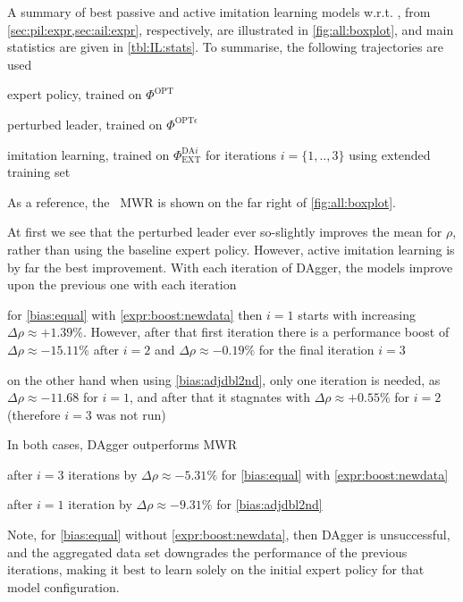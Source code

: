 \documentclass[smallextended]{svjour3}
\begin{document}
	A summary of  best passive and active imitation learning models
	w.r.t. \namerho, from 
	\cref{sec:pil:expr,sec:ail:expr}, respectively, are illustrated in 
	\cref{fig:all:boxplot}, and main statistics are given in 
	\cref{tbl:IL:stats}. To summarise, the following trajectories are used
	\begin{enumerate*}
		\item expert policy, trained on $\Phi^{\text{OPT}}$
		\item perturbed leader, trained on $\Phi^{\text{OPT}\epsilon}$
		\item imitation learning, trained on $\Phi^{\text{DA}i}_{\text{EXT}}$ for 
		iterations $i=\{1,..,3\}$ using extended training set
	\end{enumerate*}
	As a reference, the \sdr\ MWR is shown on the far right of 
	\cref{fig:all:boxplot}.
	
	At first we see that the perturbed leader ever so-slightly improves the mean 
	for $\rho$, rather than using the baseline expert policy. 
	However, active imitation learning is by far the best improvement. With each 
	iteration of DAgger, the models improve upon the previous one with each 
	iteration
	\begin{enumerate*}  
		\item for \ref{bias:equal} with \ref{expr:boost:newdata} then $i=1$ starts 
		with increasing  $\Delta\rho\approx+1.39\%$. However, after that first 
		iteration there is a performance boost of $\Delta\rho\approx-15.11\%$ after 
		$i=2$ and $\Delta\rho\approx-0.19\%$ for the final iteration $i=3$
		\item on the other hand when using \ref{bias:adjdbl2nd}, only one iteration 
		is needed, as  $\Delta\rho\approx-11.68$ for $i=1$, and after that it 
		stagnates with $\Delta\rho\approx+0.55\%$ for $i=2$ 
		(therefore $i=3$ was not run)
	\end{enumerate*}
	In both cases, DAgger outperforms MWR
	\begin{enumerate*}
		\item after $i=3$ iterations by $\Delta\rho\approx-5.31\%$ for 
		\ref{bias:equal} with \ref{expr:boost:newdata}
		\item after $i=1$ iteration by $\Delta\rho\approx-9.31\%$ for 
		\ref{bias:adjdbl2nd}
	\end{enumerate*}
	Note, for \ref{bias:equal} without \ref{expr:boost:newdata}, then DAgger is 
	unsuccessful, and the aggregated data set downgrades the performance of the 
	previous iterations, making it best to learn solely on the initial expert 
	policy for that model configuration.
	
\end{document}
